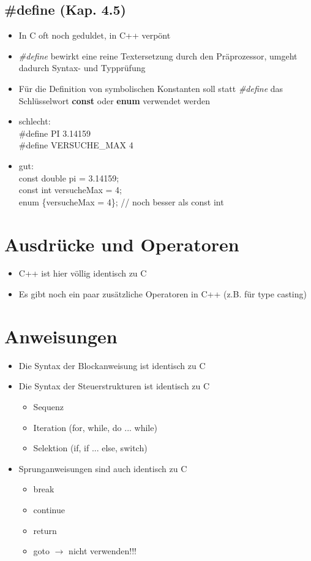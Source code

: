\subsection{{\#}define		(Kap. 4.5)}
\label{sec:define}
\begin{itemize}
	\item In C oft noch geduldet, in C++ verpönt
	\item \emph{\#define} bewirkt eine reine Textersetzung durch den Präprozessor, umgeht dadurch Syntax- und Typprüfung
	\item Für die Definition von symbolischen Konstanten soll statt \emph{ \#define} das Schlüsselwort \textbf{const} oder \textbf{enum} verwendet 	werden
 	\color{red}
	\item schlecht:
	\\
	\#define PI			3.14159
	\\ 
	\#define VERSUCHE\_MAX	4
	\color{green}
	\item gut:
	\\const double pi = 3.14159;
	\\const int versucheMax = 4;
	\\enum \{versucheMax = 4\};	// noch besser als const int
\end{itemize}

\section{Ausdrücke und Operatoren}
\label{sec:Ausdruecke und Operatoren}
\begin{itemize}
	\item C++ ist hier völlig identisch zu C
	\item Es gibt noch ein paar zusätzliche Operatoren in C++ (z.B. für type casting)
\end{itemize}

\section{Anweisungen}
\label{sec:Anweisungen}
\begin{itemize}
	\item Die Syntax der Blockanweisung ist identisch zu C
	\item Die Syntax der Steuerstrukturen ist identisch zu C
	\begin{itemize}
		\item Sequenz
		\item Iteration (for, while, do ... while)
		\item Selektion (if, if ... else, switch)
	\end{itemize}
	\item Sprunganweisungen sind auch identisch zu C
	\begin{itemize}
		\item break
		\item continue
		\item return
		\item goto $\rightarrow$ nicht verwenden!!!
	\end{itemize}
\end{itemize}

